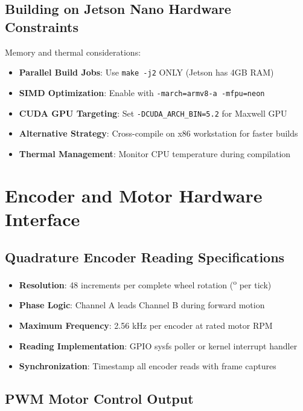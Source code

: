 \subsection{Building on Jetson Nano Hardware Constraints}

Memory and thermal considerations:

\begin{itemize}
    \item \textbf{Parallel Build Jobs}: Use \texttt{make -j2} ONLY (Jetson has 4GB RAM)
    \item \textbf{SIMD Optimization}: Enable with \texttt{-march=armv8-a -mfpu=neon}
    \item \textbf{CUDA GPU Targeting}: Set \texttt{-DCUDA\_ARCH\_BIN=5.2} for Maxwell GPU
    \item \textbf{Alternative Strategy}: Cross-compile on x86 workstation for faster builds
    \item \textbf{Thermal Management}: Monitor CPU temperature during compilation
\end{itemize}

\section{Encoder and Motor Hardware Interface}

\subsection{Quadrature Encoder Reading Specifications}

\begin{itemize}
    \item \textbf{Resolution}: 48 increments per complete wheel rotation (\textsuperscript{o} per tick)
    \item \textbf{Phase Logic}: Channel A leads Channel B during forward motion
    \item \textbf{Maximum Frequency}: 2.56 kHz per encoder at rated motor RPM
    \item \textbf{Reading Implementation}: GPIO sysfs poller or kernel interrupt handler
    \item \textbf{Synchronization}: Timestamp all encoder reads with frame captures
\end{itemize}

\subsection{PWM Motor Control Output}

